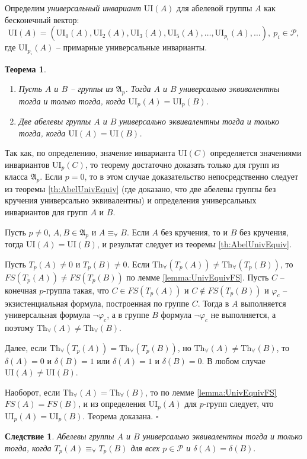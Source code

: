 \documentclass[a4paper,11pt,twoside]{article}
\newtheorem{theorem}{Теорема}[section]
\newtheorem{corollary}{Следствие}[section]
\def\proof{{\noindent{\bf Доказательство.}} }
\def\A{{\mathfrak{A}}}
\def\P{{\mathcal{P}}}
\def\Tha{{\mathrm{Th}_\forall}}
\def\ui{{\mathrm{UI}}}
\begin{document}
Определим \textit{универсальный инвариант} $\ui(A)$ для абелевой группы $A$ как бесконечный вектор:
$$\ui(A) = (\ui_{0}(A), \ui_{2}(A), \ui_{3}(A),\ui_{5}(A),\ldots, \ui_{p_i}(A), \ldots), \ p_i \in \P,$$
где $\ui_{p_i}(A)$ -- примарные универсальные инварианты.


\begin{theorem}\label{th:UnivEquivOfGroups}
\begin{enumerate}
\item Пусть $A$ и $B$ -- группы из $\A_p$. Тогда $A$ и $B$ универсально эквивалентны тогда и только тогда, когда $\ui_p(A) = \ui_p(B)$.
\item Две абелевы группы $A$ и $B$ универсально эквивалентны тогда и только тогда, когда $\ui(A) = \ui(B)$.
\end{enumerate}
\end{theorem}


\proof Так как, по определению, значение инварианта $\ui(C)$ определяется значениями инвариантов $\ui_p(C)$, то теорему достаточно доказать только для групп из класса $\A_p$. Если $p=0$, то в этом случае доказательство непосредственно следует из теоремы \ref{th:AbelUnivEquiv} (где доказано, что две абелевы группы без кручения универсально эквивалентны) и определения универсальных инвариантов для групп $A$ и $B$.

Пусть $p \neq 0$, $A, B \in \A_p$ и $A \equiv_\forall B$. Если $A$ без кручения, то и $B$ без кручения, тогда $\ui(A) = \ui(B)$, и результат следует из теоремы \ref{th:AbelUnivEquiv}.

Пусть $T_p(A) \neq 0$ и $T_p(B) \neq 0$. Если $\Tha(T_p(A)) \neq \Tha(T_p(B))$, то $FS(T_p(A)) \neq FS(T_p(B))$ по лемме \ref{lemma:UnivEquivFS}. Пусть $C$ -- конечная $p$-группа такая, что $C \in FS(T_p(A))$ и $C \notin FS(T_p(B))$ и $\varphi_c$ -- экзистенциальная формула, построенная по группе $C$. Тогда в $A$ выполняется универсальная формула $\neg \varphi_c$, а в группе $B$ формула $\neg \varphi_c$ не выполняется, а поэтому $\Tha(A) \neq \Tha(B)$.

Далее, если $\Tha(T_p(A)) = \Tha(T_p(B))$, но $\Tha(A) \neq \Tha(B)$, то $\delta(A) = 0$ и $\delta(B) = 1$ или $\delta(A) = 1$ и $\delta(B) = 0$. В любом случае $\ui(A) \neq \ui(B)$. 

Наоборот, если $\Tha(A) = \Tha(B)$, то по лемме \ref{lemma:UnivEquivFS} $FS(A) = FS(B)$, и из определения $\ui_p(A)$ для $p$-групп следует, что $\ui_p(A) = \ui_p(B)$. Теорема доказана. $\square$

\begin{corollary}\label{cor:UnivEquivTpA_TpB}
Абелевы группы $A$ и $B$ универсально эквивалентны тогда и только тогда, когда $T_p(A) \equiv_\forall T_p(B)$ для всех $p \in \P$ и $\delta(A) = \delta(B).$
\end{corollary}
\end{document}

